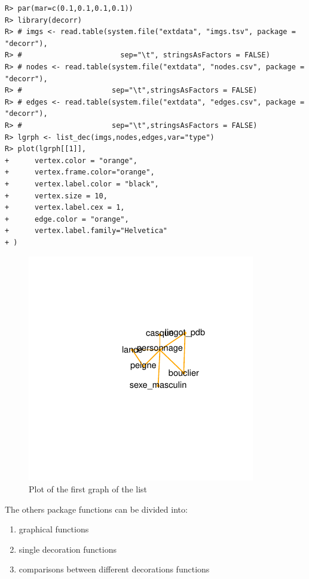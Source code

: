 \documentclass[article]{jss}\usepackage{knitr}
\begin{document}
\begin{kframe}
\begin{verbatim}
R> par(mar=c(0.1,0.1,0.1,0.1))
R> library(decorr)
R> # imgs <- read.table(system.file("extdata", "imgs.tsv", package = "decorr"),
R> #                       sep="\t", stringsAsFactors = FALSE)
R> # nodes <- read.table(system.file("extdata", "nodes.csv", package = "decorr"),
R> #                     sep="\t",stringsAsFactors = FALSE)
R> # edges <- read.table(system.file("extdata", "edges.csv", package = "decorr"),
R> #                     sep="\t",stringsAsFactors = FALSE)
R> lgrph <- list_dec(imgs,nodes,edges,var="type")
R> plot(lgrph[[1]],
+      vertex.color = "orange",
+      vertex.frame.color="orange",
+      vertex.label.color = "black",
+      vertex.size = 10,
+      vertex.label.cex = 1,
+      edge.color = "orange",
+      vertex.label.family="Helvetica"
+ )
\end{verbatim}
\end{kframe}\begin{figure}[H]

{\centering \includegraphics[width=\maxwidth]{figure/unnamed-chunk-8-1} 

}

\caption{\label{fig:figs}Plot of the first graph of the list}\label{fig:unnamed-chunk-8}
\end{figure}




The others  package functions can be divided into:
\begin{enumerate}
 \item graphical functions
 \item single decoration functions
 \item comparisons between different decorations functions
\end{enumerate}
\end{document}
